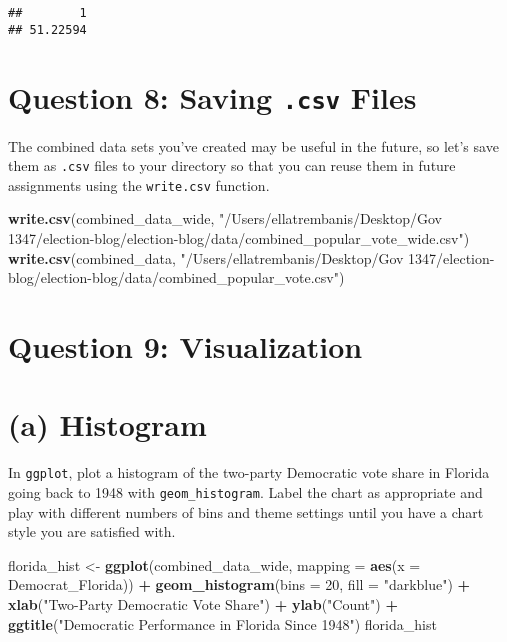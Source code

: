 \documentclass[
]{article}
\newenvironment{Shaded}{\begin{snugshade}}{\end{snugshade}}
\newcommand{\AttributeTok}[1]{\textcolor[rgb]{0.13,0.29,0.53}{#1}}
\newcommand{\DecValTok}[1]{\textcolor[rgb]{0.00,0.00,0.81}{#1}}
\newcommand{\FunctionTok}[1]{\textcolor[rgb]{0.13,0.29,0.53}{\textbf{#1}}}
\newcommand{\NormalTok}[1]{#1}
\newcommand{\OtherTok}[1]{\textcolor[rgb]{0.56,0.35,0.01}{#1}}
\newcommand{\SpecialCharTok}[1]{\textcolor[rgb]{0.81,0.36,0.00}{\textbf{#1}}}
\newcommand{\StringTok}[1]{\textcolor[rgb]{0.31,0.60,0.02}{#1}}
\begin{document}
\begin{verbatim}
##        1 
## 51.22594
\end{verbatim}

\section{\texorpdfstring{Question 8: Saving \texttt{.csv}
Files}{Question 8: Saving .csv Files}}\label{question-8-saving-.csv-files}

The combined data sets you've created may be useful in the future, so
let's save them as \texttt{.csv} files to your directory so that you can
reuse them in future assignments using the \texttt{write.csv} function.

\begin{Shaded}
\begin{Highlighting}[]
\FunctionTok{write.csv}\NormalTok{(combined\_data\_wide, }\StringTok{"/Users/ellatrembanis/Desktop/Gov 1347/election{-}blog/election{-}blog/data/combined\_popular\_vote\_wide.csv"}\NormalTok{)}
\FunctionTok{write.csv}\NormalTok{(combined\_data, }\StringTok{"/Users/ellatrembanis/Desktop/Gov 1347/election{-}blog/election{-}blog/data/combined\_popular\_vote.csv"}\NormalTok{)}
\end{Highlighting}
\end{Shaded}

\section{Question 9: Visualization}\label{question-9-visualization}

\section{(a) Histogram}\label{a-histogram}

In \texttt{ggplot}, plot a histogram of the two-party Democratic vote
share in Florida going back to 1948 with \texttt{geom\_histogram}. Label
the chart as appropriate and play with different numbers of bins and
theme settings until you have a chart style you are satisfied with.

\begin{Shaded}
\begin{Highlighting}[]
\NormalTok{florida\_hist }\OtherTok{\textless{}{-}} \FunctionTok{ggplot}\NormalTok{(combined\_data\_wide, }
       \AttributeTok{mapping =} \FunctionTok{aes}\NormalTok{(}\AttributeTok{x =}\NormalTok{ Democrat\_Florida)) }\SpecialCharTok{+}
  \FunctionTok{geom\_histogram}\NormalTok{(}\AttributeTok{bins =} \DecValTok{20}\NormalTok{, }\AttributeTok{fill =} \StringTok{"darkblue"}\NormalTok{) }\SpecialCharTok{+}
  \FunctionTok{xlab}\NormalTok{(}\StringTok{"Two{-}Party Democratic Vote Share"}\NormalTok{) }\SpecialCharTok{+}
  \FunctionTok{ylab}\NormalTok{(}\StringTok{"Count"}\NormalTok{) }\SpecialCharTok{+}
  \FunctionTok{ggtitle}\NormalTok{(}\StringTok{"Democratic Performance in Florida Since 1948"}\NormalTok{)}
\NormalTok{florida\_hist}
\end{Highlighting}
\end{Shaded}
\end{document}
